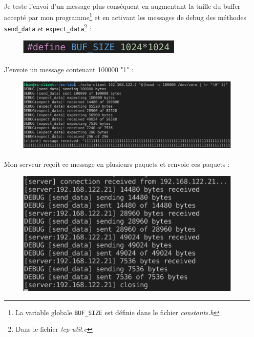\documentclass{article}
\begin{document}
    \paragraph{}
    Je teste l'envoi d'un message plus conséquent en augmentant la taille du buffer accepté par mon programme\footnote{La variable globale \texttt{BUF\_SIZE} est définie dans le fichier \emph{constants.h}} et en activant les messages de debug des méthodes \texttt{send\_data} et \texttt{expect\_data}\footnote{Dans le fichier \emph{tcp-util.c}} :
    \begin{figure}[H]
        \centering
        \includegraphics[width=.35\linewidth]{./screenshots/test-100000-buffer-size.png}
    \end{figure}

    \paragraph{}
    J'envoie un message contenant 100000 "1" :
    \begin{figure}[H]
        \centering
        \includegraphics[width=\linewidth]{./screenshots/launch-client-100000.png}
    \end{figure}

    \paragraph{}
    Mon serveur reçoit ce message en plusieurs paquets et renvoie ces paquets :
    \begin{figure}[H]
        \centering
        \includegraphics[width=.6\linewidth]{./screenshots/server-test-100000.png}
    \end{figure}
\end{document}
